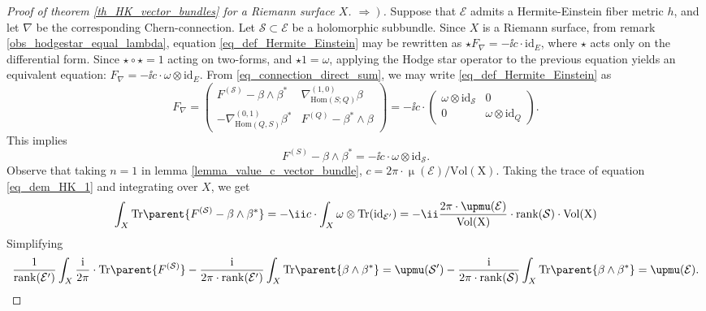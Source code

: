 \begin{proof}[\textit{Proof of theorem} \ref{th_HK_vector_bundles} \textit{for a Riemann surface} \(X\). \(\left.\Rightarrow\right)\)]
    Suppose that \(\mathcal{E}\) admits a Hermite-Einstein fiber metric \(h\), and let \(\nabla\) be the corresponding Chern-connection. Let \(\mathcal{S}\subset \mathcal{E}\) be a holomorphic subbundle. Since \(X\) is a Riemann surface, from remark \ref{obs_hodgestar_equal_lambda}, equation \eqref{eq_def_Hermite_Einstein} may be rewritten as \(\star F_\nabla=-\ii c \cdot \mathrm{id}_E\), where \(\star\) acts only on the differential form. Since \(\star\circ \star=1\) acting on two-forms, and \(\star 1=\omega\), applying the Hodge star operator to the previous equation yields an equivalent equation: \(F_\nabla=-\ii c \cdot \omega \otimes \mathrm{id}_E\). From \eqref{eq_connection_direct_sum}, we may write \eqref{eq_def_Hermite_Einstein} as
    \begin{equation} \label{eq_separeted_HYM}
    F_\nabla = \begin{pmatrix}
        F^{(\mathcal{S})}-\beta \wedge \beta^* & \nabla^{(1,0)}_{\mathrm{Hom}(S;Q)}\beta \\
        -\nabla^{(0,1)}_{\mathrm{Hom}(Q,S)} \beta^* & F^{(Q)}-\beta^*\wedge \beta
    \end{pmatrix} = -\ii c\cdot 
    \begin{pmatrix}
     \omega \otimes \mathrm{id}_{\mathcal{S}} & 0 \\
     0 & \omega \otimes \mathrm{id}_Q
    \end{pmatrix}.
    \end{equation}
    This implies 
    \begin{equation} \label{eq_dem_HK_1}
    F^{(S)}-\beta\wedge \beta^*= -\ii c\cdot  \omega \otimes \mathrm{id}_{\mathcal{S}}.
    \end{equation}
    Observe that taking \(n=1\) in lemma \ref{lemma_value_c_vector_bundle}, \(c=2\pi \cdot \upmu(\mathcal{E})/\mathrm{Vol(X)}\). Taking the trace of equation \eqref{eq_dem_HK_1} and integrating over \(X\), we get
    \[
    \int_X \mathrm{Tr}\parent{F^{(\mathcal{S})}-\beta \wedge \beta^*}=-\ii c\cdot \int_X\mathrm{\omega \otimes Tr(\mathrm{id}_{\mathcal{E'}})}=-\ii \frac{2 \pi\cdot \upmu(\mathcal{E})}{\mathrm{Vol(X)}}\cdot \mathrm{rank(\mathcal{S})}\cdot \mathrm{Vol(X)}
    \]
    Simplifying
    \[
    \frac{1}{\mathrm{rank}(\mathcal{E'})}\int_X\frac{\mathrm{i}}{2 \pi}\cdot  \mathrm{Tr}\parent{F^{(\mathcal{S})}}-\frac{\mathrm{i}}{2\pi\cdot \mathrm{rank}(\mathcal{E'})}\int_X \mathrm{Tr}\parent{\beta \wedge \beta^*}=\upmu(\mathcal{S'})-\frac{\mathrm{i}}{2\pi\cdot \mathrm{rank}(\mathcal{S})}\int_X \mathrm{Tr}\parent{\beta \wedge \beta^*}=\upmu(\mathcal{E}).
\]
\end{proof}
